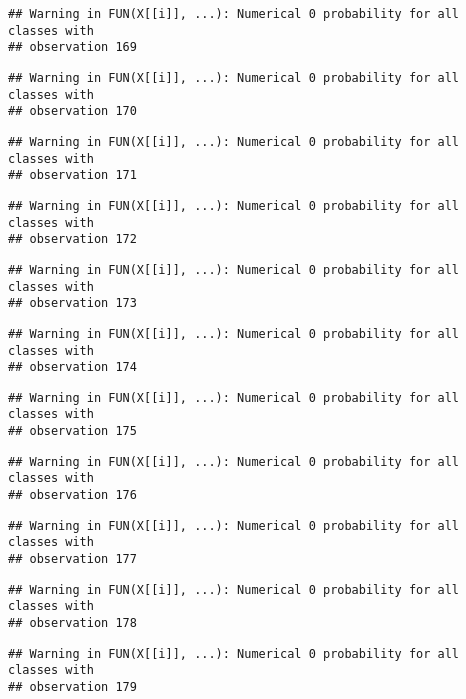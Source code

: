 \documentclass[
]{article}
\begin{document}
\begin{verbatim}
## Warning in FUN(X[[i]], ...): Numerical 0 probability for all classes with
## observation 169
\end{verbatim}

\begin{verbatim}
## Warning in FUN(X[[i]], ...): Numerical 0 probability for all classes with
## observation 170
\end{verbatim}

\begin{verbatim}
## Warning in FUN(X[[i]], ...): Numerical 0 probability for all classes with
## observation 171
\end{verbatim}

\begin{verbatim}
## Warning in FUN(X[[i]], ...): Numerical 0 probability for all classes with
## observation 172
\end{verbatim}

\begin{verbatim}
## Warning in FUN(X[[i]], ...): Numerical 0 probability for all classes with
## observation 173
\end{verbatim}

\begin{verbatim}
## Warning in FUN(X[[i]], ...): Numerical 0 probability for all classes with
## observation 174
\end{verbatim}

\begin{verbatim}
## Warning in FUN(X[[i]], ...): Numerical 0 probability for all classes with
## observation 175
\end{verbatim}

\begin{verbatim}
## Warning in FUN(X[[i]], ...): Numerical 0 probability for all classes with
## observation 176
\end{verbatim}

\begin{verbatim}
## Warning in FUN(X[[i]], ...): Numerical 0 probability for all classes with
## observation 177
\end{verbatim}

\begin{verbatim}
## Warning in FUN(X[[i]], ...): Numerical 0 probability for all classes with
## observation 178
\end{verbatim}

\begin{verbatim}
## Warning in FUN(X[[i]], ...): Numerical 0 probability for all classes with
## observation 179
\end{verbatim}
\end{document}
